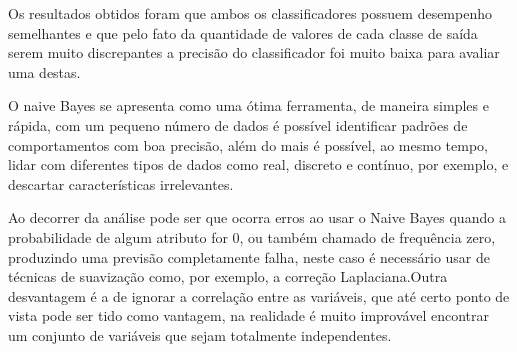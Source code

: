 \documentclass[conference]{IEEEtran}
\begin{document}
Os resultados obtidos foram que ambos os classificadores possuem desempenho semelhantes e que pelo fato da quantidade de valores de cada classe de saída serem muito discrepantes a precisão do classificador foi muito baixa para avaliar uma destas.

O naive Bayes se apresenta como uma ótima ferramenta, de maneira simples e rápida, com um pequeno número de dados é possível identificar padrões de comportamentos com boa precisão, além do mais é possível, ao mesmo tempo, lidar com diferentes tipos de dados como real, discreto e contínuo, por exemplo, e descartar características irrelevantes.

Ao decorrer da análise pode ser que ocorra erros ao usar o Naive Bayes quando a probabilidade de algum atributo for 0, ou também chamado de frequência zero, produzindo uma previsão completamente falha, neste caso é necessário usar de técnicas de suavização como, por exemplo, a correção Laplaciana.Outra desvantagem é a de ignorar a correlação entre as variáveis, que até certo ponto de vista pode ser tido como vantagem, na realidade é muito improvável encontrar um conjunto de variáveis que sejam totalmente independentes.

\nocite{*}

\end{document}
